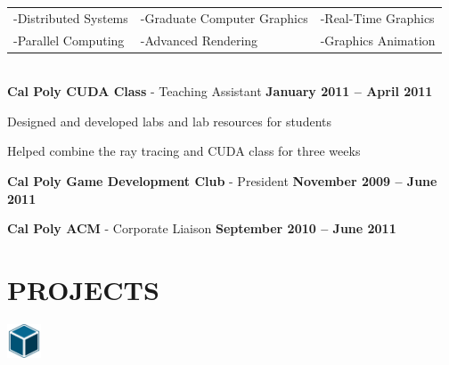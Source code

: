 \documentclass[margin,line]{resume}
\begin{document}
\begin{resume}
	\vspace{1mm} %
	\begin{tabular}{@{}p{5cm}p{5cm}p{5cm}}
	-Distributed Systems     &  -Graduate Computer Graphics &  -Real-Time Graphics\\
	-Parallel Computing      &  -Advanced Rendering         &  -Graphics Animation\\
	\end{tabular}
	\vspace{2mm} \\
	\textbf{\listing Cal Poly CUDA Class} - Teaching Assistant \hfill \textbf{ January 2011 -- April 2011}\vspace{-3mm}\\\vspace{-1mm}%
    \begin{list2}
    	\item Designed and developed labs and lab resources for students
        \item Helped combine the ray tracing and CUDA class for three weeks
    \end{list2}\vspace{-1.5mm}

	\textbf{\listing Cal Poly Game Development Club} - President\hfill \textbf{ November 2009 -- June 2011}\vspace{-3mm}\\\vspace{-1mm}%

	\textbf{\listing Cal Poly ACM} - Corporate Liaison\hfill \textbf{ September 2010 -- June 2011}\vspace{-3mm}\\\vspace{-1mm}%


\sectionline

    \section{\mysidestyle \textbf{\large{P}\small{ROJECTS}}}

    \vspace{1mm}\hspace{2mm}\includegraphics[width=10mm]{mrvoxel.png}\vspace{-15mm}


\end{resume}
\end{document}
